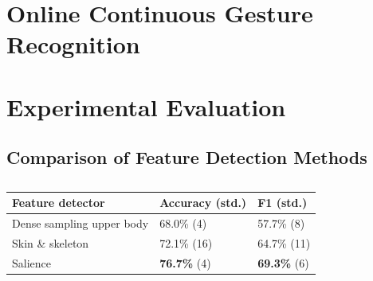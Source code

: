 \documentclass{sigchi}
\newcommand\tabhead[1]{\small\textbf{#1}}
\begin{document}
\section{Online Continuous Gesture Recognition}
\section{Experimental Evaluation}

% 
\subsection{Comparison of Feature Detection Methods}

%   
\begin{table}
\centering
\begin{tabular}{|l|l|l|}
\hline
\tabhead{Feature detector} & {\tabhead{Accuracy (std.)}} & {\tabhead{F1 (std.)}}\\
\hline
Dense sampling upper body & 68.0\% (4) & 57.7\% (8)\\
\hline
Skin \& skeleton & 72.1\% (16) & 64.7\% (11) \\
\hline
Salience & \textbf{76.7\%} (4) & \textbf{69.3\%} (6) \\
\hline
\end{tabular}
\caption{}
\end{table}
\end{document}
